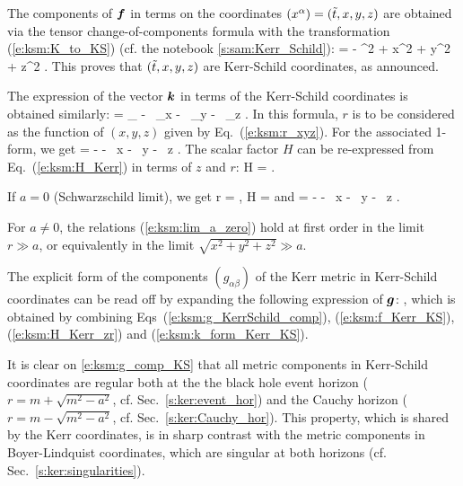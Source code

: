 The components of $\bm{f}$ in terms on the coordinates
$(x^\alpha)=({\tilde t}, x, y, z)$ are obtained
via the tensor change-of-components formula with
the transformation (\ref{e:ksm:K_to_KS})
(cf. the notebook \ref{s:sam:Kerr_Schild}):
\be \label{e:ksm:f_Kerr_KS}
  = - \dd\ti^2 + \dd x^2 + \dd y^2 + \dd z^2 .
\ee
This proves that $({\tilde t}, x, y, z)$ are Kerr-Schild coordinates, as announced.

The expression of the vector $\bm{k}$ in terms of the Kerr-Schild coordinates
is obtained similarly:
\be
     = \wpar_{\ti} -  \, \wpar_x
        -  \, \wpar_y
        - \, \wpar_z .
\ee
In this formula, $r$ is to be considered as the function of $(x,y,z)$ given
by Eq.~(\ref{e:ksm:r_xyz}). For the associated 1-form, we get
\be \label{e:ksm:k_form_Kerr_KS}
     = - \dd\ti -  \, \dd x
       -  \, \dd y
        - \, \dd z .
\ee
The scalar factor $H$ can be re-expressed from Eq.~(\ref{e:ksm:H_Kerr})
in terms of $z$ and $r$:
\be \label{e:ksm:H_Kerr_zr}
    H =   .
\ee

\begin{remark}
If $a=0$ (Schwarzschild limit), we get
\be \label{e:ksm:lim_a_zero}
    r = , \quad
    H =  \quad\mbox{and}\quad
     = - \dd\ti -  \, \dd x
       -  \, \dd y
        - \, \dd z .
\ee
\end{remark}

\begin{remark}
For $a \not = 0$, the relations (\ref{e:ksm:lim_a_zero}) hold at first order
in the limit $r \gg a$, or equivalently in the limit $\sqrt{x^2 + y^2 + z^2} \gg a$.
\end{remark}

The explicit form of the components
$(g_{\alpha\beta})$ of the Kerr metric in Kerr-Schild coordinates can be read off by expanding
the following expression of $\bm{g}$:
\be \label{e:ksm:g_comp_KS}
 ,
\ee
which is obtained by combining Eqs~(\ref{e:ksm:g_KerrSchild_comp}), (\ref{e:ksm:f_Kerr_KS}),
(\ref{e:ksm:H_Kerr_zr})
and (\ref{e:ksm:k_form_Kerr_KS}).
\begin{remark}
It is clear on \eqref{e:ksm:g_comp_KS} that all metric components in Kerr-Schild
coordinates are regular both at the the black hole event horizon
($r= m + \sqrt{m^2 - a^2}$, cf. Sec.~\ref{s:ker:event_hor}) and the Cauchy horizon
($r = m - \sqrt{m^2 - a^2}$, cf. Sec.~\ref{s:ker:Cauchy_hor}).
This property, which is shared by the Kerr coordinates,
is in sharp contrast with the metric components in
Boyer-Lindquist coordinates, which are singular at both horizons (cf. Sec.~\ref{s:ker:singularities}).
\end{remark}

